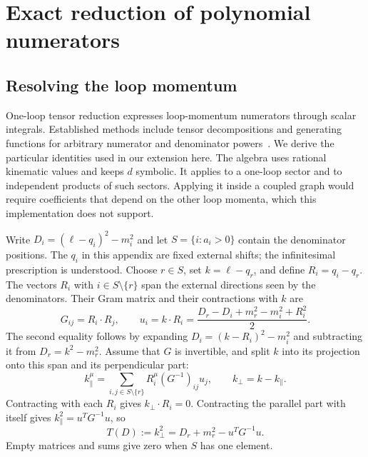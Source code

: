 \section{Exact reduction of polynomial numerators}
\label{app:tensor-reduction}
\subsection{Resolving the loop momentum}
One-loop tensor reduction expresses loop-momentum numerators through scalar integrals. Established methods include tensor decompositions and generating functions for arbitrary numerator and denominator powers~\cite{DennerDittmaier2006,Hu2025}. We derive the particular identities used in our extension here. The algebra uses rational kinematic values and keeps $d$ symbolic. It applies to a one-loop sector and to independent products of such sectors. Applying it inside a coupled graph would require coefficients that depend on the other loop momenta, which this implementation does not support.

Write $D_i=(\ell-q_i)^2-m_i^2$ and let $S=\{i:a_i>0\}$ contain the denominator positions. The $q_i$ in this appendix are fixed external shifts; the infinitesimal prescription is understood. Choose $r\in S$, set $k=\ell-q_r$, and define $R_i=q_i-q_r$. The vectors $R_i$ with $i\in S\setminus\{r\}$ span the external directions seen by the denominators. Their Gram matrix and their contractions with $k$ are
\begin{equation}
 G_{ij}=R_i\cdot R_j,\qquad
 u_i=k\cdot R_i=\frac{D_r-D_i+m_r^2-m_i^2+R_i^2}{2}.
 \label{eq:tensor-u}
\end{equation}
The second equality follows by expanding $D_i=(k-R_i)^2-m_i^2$ and subtracting it from $D_r=k^2-m_r^2$. Assume that $G$ is invertible, and split $k$ into its projection onto this span and its perpendicular part:
\begin{equation}
 k_\parallel^\mu=\sum_{i,j\in S\setminus\{r\}}R_i^\mu(G^{-1})_{ij}u_j,
 \qquad k_\perp=k-k_\parallel.
 \label{eq:tensor-projection}
\end{equation}
Contracting with each $R_i$ gives $k_\perp\cdot R_i=0$. Contracting the parallel part with itself gives $k_\parallel^2=u^TG^{-1}u$, so
\begin{equation}
 T(D):=k_\perp^2=D_r+m_r^2-u^TG^{-1}u.
 \label{eq:tensor-radius}
\end{equation}
Empty matrices and sums give zero when $S$ has one element.

